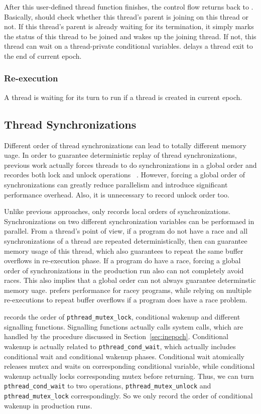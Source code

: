 After this user-defined thread function finishes, the control flow returns back to \doubletake{}. 
Basically, \doubletake{} should check whether this thread's parent is joining on this thread or not. 
If this thread's parent is already waiting for its termination, it simply marks the status of 
this thread to be joined and wakes up the joining thread. 
If not, this thread can wait on a thread-private conditional variables. 
\doubletake{} delays a thread exit to the end of current epoch.

\subsubsection{Re-execution}
A thread is waiting for its turn to run if a thread is created in current epoch.    

\subsection{Thread Synchronizations}

\label{sec:sync}

Different order of thread synchronizations can lead to totally different memory uage. 
In order to guarantee deterministic replay of thread synchronizations, previous work
actually forces threads to do synchronizations in a global order and
recordes both lock and unlock operations ~\cite{TERN, PRES}. 
However, forcing a global order of synchronizations can greatly 
reduce parallelism and introduce significant performance overhead.
Also, it is unnecessary to record unlock order too.

Unlike previous approaches, \doubletake{} only records local orders of synchronizations.
Synchronizations on two different synchronization variables can be performaed
in parallel. From a thread's point of view, if a program do not have a race and
all synchronizations of a thread are repeated deterministically, then
\doubletake{} can guarantee memory usage of this thread, which also guarantees to 
repeat the same buffer overflows in re-execution phase. 
If a program do have a race, forcing a global order of synchronizations in the production 
run also can not completely avoid races. This also implies that a global order 
can not always guarantee determinstic memory uage.   
\doubletake{} prefers performance for racey programs, while relying on multiple re-executions 
to repeat buffer overflows if a program does have a race problem. 

\doubletake{} records the order of \texttt{pthread\_mutex\_lock}, conditional wakenup and
different signalling functions.
Signalling functions actually calls system calls, which are handled by the procedure discussed 
in Section~\ref{sec:inepoch}.
 Conditional wakenup is actually related to \texttt{pthread\_cond\_wait},
which actually includes conditional wait and conditional wakenup phases. 
Conditional wait atomically releases mutex and waits on corresponding conditional variable, while conditional wakenup actually locks corresponding mutex before returning. 
Thus, we can turn \texttt{pthread\_cond\_wait} to two operations, \texttt{pthread\_mutex\_unlock} and
\texttt{pthread\_mutex\_lock} correspondingly. So we only record the order of conditional wakenup in
production runs. 
 
